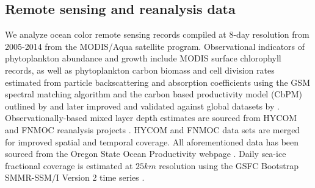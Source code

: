 

\subsection{Remote sensing and reanalysis data}

We analyze ocean color remote sensing records compiled at 8-day resolution from 2005-2014 from the MODIS/Aqua satellite program. Observational indicators of phytoplankton abundance and growth include MODIS surface chlorophyll records, as well as phytoplankton carbon biomass and cell division rates estimated from particle backscattering and absorption coefficients using the GSM spectral matching algorithm \parencite{GarverInherentopticalproperty1997} and the carbon based productivity model (CbPM) outlined by \textcite{BehrenfeldCarbonbasedoceanproductivity2005} and later improved and validated against global datasets by \textcite{WestberryCarbonbasedprimaryproductivity2008}. Observationally-based mixed layer depth estimates are sourced from HYCOM and FNMOC reanalysis projects \parencite{MilutinovicSensitivityremotesensing2009}. HYCOM and FNMOC data sets are merged for improved spatial and temporal coverage. All aforementioned data has been sourced from the Oregon State Ocean Productivity webpage \parencite{OMalleyOceanproductivity2015}. Daily sea-ice fractional coverage is estimated at $25km$ resolution using the GSFC Bootstrap SMMR-SSM/I Version 2 time series \parencite{ComisoPassivemicrowavealgorithms1997, ShangComparisonprimaryproductivity2010,ComisoLargeDecadalDecline2011}.

